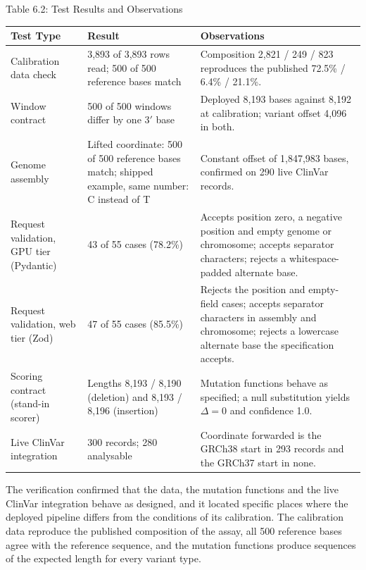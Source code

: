\vspace{8pt}
\begin{table}[!t]\centering\label{tab:6.1}
Table 6.2: Test Results and Observations\par\vspace{4pt}
\begingroup\fontsize{11}{13}\selectfont\renewcommand{\baselinestretch}{1.08}\selectfont
\renewcommand{\arraystretch}{1.45}
\noindent\begin{tabular}{|p{92pt}|p{104pt}|p{236pt}|}
\hline
Test Type & Result & Observations \\
\hline
Calibration data check & 3,893 of 3,893 rows read; 500 of 500 reference bases match & Composition 2,821 / 249 / 823 reproduces the published 72.5\% / 6.4\% / 21.1\%. \\
\hline
Window contract & 500 of 500 windows differ by one 3$'$ base & Deployed 8,193 bases against 8,192 at calibration; variant offset 4,096 in both. \\
\hline
Genome assembly & Lifted coordinate: 500 of 500 reference bases match; shipped example, same number: C instead of T & Constant offset of 1,847,983 bases, confirmed on 290 live ClinVar records. \\
\hline
Request validation, GPU tier (Pydantic) & 43 of 55 cases (78.2\%) & Accepts position zero, a negative position and empty genome or chromosome; accepts separator characters; rejects a whitespace-padded alternate base. \\
\hline
Request validation, web tier (Zod) & 47 of 55 cases (85.5\%) & Rejects the position and empty-field cases; accepts separator characters in assembly and chromosome; rejects a lowercase alternate base the specification accepts. \\
\hline
Scoring contract (stand-in scorer) & Lengths 8,193 / 8,190 (deletion) and 8,193 / 8,196 (insertion) & Mutation functions behave as specified; a null substitution yields $\Delta=0$ and confidence 1.0. \\
\hline
Live ClinVar integration & 300 records; 280 analysable & Coordinate forwarded is the GRCh38 start in 293 records and the GRCh37 start in none. \\
\hline
\end{tabular}
\endgroup
\end{table}

\vspace{8pt}
The verification confirmed that the data, the mutation functions and the live ClinVar integration behave as designed, and it located specific places where the deployed pipeline differs from the conditions of its calibration. The calibration data reproduce the published composition of the assay, all 500 reference bases agree with the reference sequence, and the mutation functions produce sequences of the expected length for every variant type.


